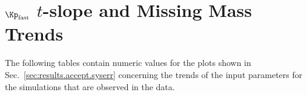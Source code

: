 \section{\label{sec:app.tab.simparams}\texorpdfstring{$\Kp_\mathrm{fast}$}{K+fast} \texorpdfstring{$t$}{t}-slope and Missing Mass Trends}

The following tables contain numeric values for the plots shown in Sec.~\ref{sec:results.accept.syserr} concerning the trends of the input parameters for the simulations that are observed in the data.




